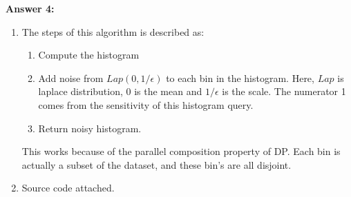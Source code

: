 \documentclass[12pt,reqno]{amsart}
\begin{document}
\newpage
\textbf{Answer 4:} 
\begin{enumerate}[label=(\alph*)]
\item The steps of this algorithm is described as:
\begin{enumerate}
\item Compute the histogram
\item Add noise from $Lap(0, 1/\epsilon)$ to each bin in the histogram. Here, $Lap$ is laplace distribution, $0$ is the mean and $1/\epsilon$ is the scale. The numerator 1 comes from the sensitivity of this histogram query.
\item Return noisy histogram.
\end{enumerate}
This works because of the parallel composition property of DP. Each bin is actually a subset of the dataset, and these bin's are all disjoint.

\item Source code attached.


\end{enumerate}
\end{document}
